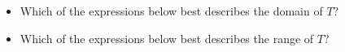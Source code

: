 \documentclass{ximera}
\begin{document}
\begin{question}
\begin{itemize}
\item Which of the expressions below best describes the domain of $T$?
\begin{multipleChoice}
\choice  {$[-7,8]$}
\choice  {$[-6,6]$}
\choice  {$[-7,-1] \cup [3,8]$}
\choice [correct] {$[-7,-1] \cup (3,8]$}
\end{multipleChoice}




\item Which of the expressions below best describes the range of $T$?
\begin{multipleChoice}
\choice [correct] {$[-6,6]$}
\choice  {$(-4, 1]$}
\choice  {$[-6,6] \cup (-4,1]$}
\choice  {$[-6,6] \cup [-4,1]$}
\end{multipleChoice}
\end{itemize}

\end{question}
\end{document}
